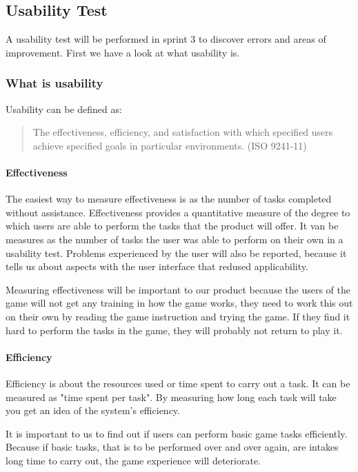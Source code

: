 \subsection{Usability Test}

A usability test will be performed in sprint 3 to discover errors and areas of improvement. First we have a look at what usability is.

\subsubsection{What is usability}

Usability can be defined as:

\begin{quote}
The effectiveness, efficiency, and satisfaction with which specified users 
achieve specified goals in particular environments. (ISO 9241-11)
\end{quote}

\paragraph{Effectiveness}

The easiest way to measure effectiveness is as the number of tasks completed without assistance. Effectiveness provides a quantitative measure of the degree to which users are able to perform the tasks that the product will offer. It van be measures as the number of tasks the user was able to perform on their own in a usability test. Problems experienced by the user will also be reported, because it tells us about aspects with the user interface that redused applicability.

Measuring effectiveness will be important to our product because the users of the game will not get any training in how the game works, they need to work this out on their own by reading the game instruction and trying the game. If they find it hard to perform the tasks in the game, they will probably not return to play it.

\paragraph{Efficiency}

Efficiency is about the resources used or time spent to carry out a task. It can be measured as "time spent per task".
By measuring how long each task will take you get an idea of the system's efficiency.

It is important to us to find out if users can perform basic game tasks efficiently. Because if basic tasks, that is to be performed over and over again, are intakes long time to carry out, the game experience will deteriorate.

